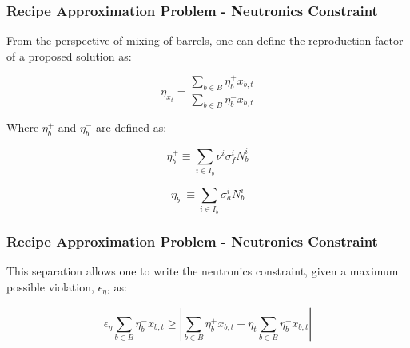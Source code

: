 \begin{frame}[ctb!]
  \frametitle{Recipe Approximation Problem - Neutronics Constraint}

  From the perspective of mixing of barrels, one can define the reproduction
  factor of a proposed solution as:

  \begin{equation}
    \label{eqs:eta_simple}
    \eta_{x_t} = \frac{\sum_{b \in B} \eta_{b}^{+} x_{b, t}}
        {\sum_{b \in B} \eta_{b}^{-} x_{b, t}}
  \end{equation}

  Where $\eta_b^+$ and $\eta_b^-$ are defined as:

  \begin{equation}
    \label{eqs:eta_+}
    \eta_{b}^{+} \equiv \sum_{i \in I_{b}} \nu^{i} \sigma_{f}^{i} N_{b}^{i}
  \end{equation}

  \begin{equation}
    \label{eqs:eta_-}
    \eta_{b}^{-} \equiv \sum_{i \in I_{b}} \sigma_{a}^{i} N_{b}^{i}
  \end{equation}
  
\end{frame}

\begin{frame}[ctb!]
  \frametitle{Recipe Approximation Problem - Neutronics Constraint} 

  This separation allows one to write the neutronics constraint, given a maximum
  possible violation, $\epsilon_{\eta}$, as:

  \begin{equation}
    \label{eqs:eta_linear}
    \epsilon_{\eta} \sum_{b \in B} \eta_{b}^{-} x_{b,t} \geq
    \left| \sum_{b \in B} \eta_{b}^{+} x_{b,t}
    - \eta_{t} \sum_{b \in B} \eta_{b}^{-} x_{b,t} \right|
  \end{equation}  
\end{frame}

